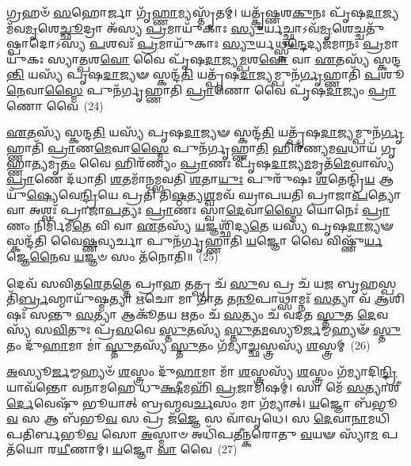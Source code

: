 𑌗𑍍𑌰𑌹𑍞᳴ \ul{𑌸}\-𑌹𑍋𑌰𑍍𑌜𑌾 𑌗𑍃᳴\-\ul{𑌹𑍍𑌣𑌾}\-𑌮𑍍𑌯𑌸𑍍𑌤𑍃᳴𑌤𑌮𑍍। 𑌯𑌤𑍍𑌕𑍃᳴𑌷𑍍𑌣𑌶\-\ul{𑌕𑍁}\-𑌨𑌃 𑌪𑍃᳴𑌷\-\ul{𑌦𑌾}\-𑌜𑍍𑌯𑌮᳴𑌵\-\ul{𑌮𑍃}\-𑌶𑍇\-\ul{𑌚𑍍𑌛𑍂}\-𑌦𑍍𑌰𑌾 𑌅᳴𑌸𑍍𑌯 \ul{𑌪𑍍𑌰}\-𑌮𑌾𑌯𑍁᳴𑌕𑌾𑌃 \ul{𑌸𑍍𑌯𑍁}\-𑌰𑍍𑌯𑌚𑍍𑌛𑍍𑌵𑌾\-𑌽𑌵᳴\-\ul{𑌮𑍃}\-𑌶𑍇𑌚𑍍𑌚𑌤𑍁᳴𑌷𑍍𑌪𑌾𑌦𑍋\-𑌽𑌸𑍍𑌯 \ul{𑌪}\-𑌶𑌵𑌃᳴ \ul{𑌪𑍍𑌰}\-𑌮𑌾𑌯𑍁᳴𑌕𑌾𑌃 \ul{𑌸𑍍𑌯𑍁}\-𑌰𑍍𑌯𑌥𑍍𑌸𑍍𑌕\-\ul{𑌨𑍍𑌦𑍇}\-𑌦𑍍𑌯𑌜᳴𑌮𑌾𑌨𑌃 \ul{𑌪𑍍𑌰}\-𑌮𑌾𑌯𑍁᳴𑌕𑌃 𑌸𑍍𑌯𑌾\-\ul{𑌤𑍍𑌪}\-𑌶\-\ul{𑌵𑍋} 𑌵𑍈 𑌪𑍃᳴𑌷\-\ul{𑌦𑌾}\-𑌜𑍍𑌯\-\ul{𑌮𑍍𑌪}\-𑌶\-\ul{𑌵𑍋} 𑌵𑌾 \ul{𑌏}\-𑌤𑌸𑍍𑌯᳴ 𑌸𑍍𑌕𑌨𑍍𑌦\-\ul{𑌨𑍍𑌤𑌿} 𑌯𑌸𑍍𑌯᳴ 𑌪𑍃𑌷\-\ul{𑌦𑌾}\-𑌜𑍍𑌯𑍟 𑌸𑍍𑌕𑌨𑍍𑌦᳴\-\ul{𑌤𑌿} 𑌯𑌤𑍍𑌪𑍃᳴𑌷\-\ul{𑌦𑌾}\-𑌜𑍍𑌯𑌮𑍍𑌪𑍁𑌨᳴\-\ul{𑌰𑍍𑌗𑍃}\-𑌹𑍍𑌣𑌾𑌤𑌿᳴ \ul{𑌪}\-𑌶𑍂\-\ul{𑌨𑍇}\-𑌵𑌾\-\ul{𑌸𑍍𑌮𑍈} 𑌪𑍁𑌨᳴𑌰𑍍𑌗𑍃𑌹𑍍𑌣𑌾𑌤𑌿 \ul{𑌪𑍍𑌰𑌾}\-𑌣𑍋 𑌵𑍈 𑌪𑍃᳴𑌷\-\ul{𑌦𑌾}\-𑌜𑍍𑌯𑌂 \ul{𑌪𑍍𑌰𑌾}\-𑌣𑍋 𑌵𑍈~(24)

\-\ul{𑌏}\-𑌤𑌸𑍍𑌯᳴ 𑌸𑍍𑌕𑌨𑍍𑌦\-\ul{𑌤𑌿} 𑌯𑌸𑍍𑌯᳴ 𑌪𑍃𑌷\-\ul{𑌦𑌾}\-𑌜𑍍𑌯𑍟 𑌸𑍍𑌕𑌨𑍍𑌦᳴\-\ul{𑌤𑌿} 𑌯𑌤𑍍𑌪𑍃᳴𑌷\-\ul{𑌦𑌾}\-𑌜𑍍𑌯𑌮𑍍𑌪𑍁𑌨᳴\-\ul{𑌰𑍍𑌗𑍃}\-𑌹𑍍𑌣𑌾𑌤𑌿᳴ \ul{𑌪𑍍𑌰𑌾}\-𑌣\-\ul{𑌮𑍇}\-𑌵𑌾\-\ul{𑌸𑍍𑌮𑍈} 𑌪𑍁𑌨᳴𑌰𑍍𑌗𑍃𑌹𑍍𑌣𑌾\-\ul{𑌤𑌿} 𑌹𑌿𑌰᳴𑌣𑍍𑌯𑌮\-\ul{𑌵}\-𑌧𑌾𑌯᳴ 𑌗𑍃𑌹𑍍𑌣𑌾\-\ul{𑌤𑍍𑌯}\-𑌮𑍃\-\ul{𑌤𑌂} 𑌵𑍈 𑌹𑌿𑌰᳴𑌣𑍍𑌯𑌂 \ul{𑌪𑍍𑌰𑌾}\-𑌣𑌃 𑌪𑍃᳴𑌷\-\ul{𑌦𑌾}\-𑌜𑍍𑌯\-\ul{𑌮}\-𑌮𑍃𑌤᳴\-\ul{𑌮𑍇}\-𑌵𑌾𑌸𑍍𑌯᳴ \ul{𑌪𑍍𑌰𑌾}\-𑌣𑍇 𑌦᳴𑌧𑌾𑌤𑌿 \ul{𑌶}\-𑌤𑌮𑌾᳴𑌨𑌮𑍍𑌭𑌵𑌤𑌿 \ul{𑌶}\-𑌤𑌾\-\ul{𑌯𑍁𑌃} 𑌪𑍁𑌰𑍁᳴𑌷𑌃 \ul{𑌶}\-𑌤𑍇𑌨𑍍𑌦𑍍𑌰𑌿᳴\-\ul{𑌯} 𑌆𑌯𑍁᳴\-\ul{𑌷𑍍𑌯𑍇}\-𑌵𑍇\-\ul{𑌨𑍍𑌦𑍍𑌰𑌿}\-𑌯𑍇 𑌪𑍍𑌰𑌤𑌿᳴ 𑌤𑌿\-\ul{𑌷𑍍𑌠}\-𑌤𑍍𑌯\-\ul{𑌶𑍍𑌵}\-𑌮𑌵᳴ 𑌘𑍍𑌰𑌾𑌪𑌯𑌤𑌿 𑌪𑍍𑌰𑌾𑌜𑌾\-\ul{𑌪}\-𑌤𑍍𑌯𑍋 𑌵𑌾 𑌅𑌶𑍍𑌵𑌃᳴ 𑌪𑍍𑌰𑌾𑌜𑌾\-\ul{𑌪}\-𑌤𑍍𑌯𑌃 \ul{𑌪𑍍𑌰𑌾}\-𑌣𑌃 𑌸𑍍𑌵𑌾\-\ul{𑌦𑍇}\-𑌵𑌾\-\ul{𑌸𑍍𑌮𑍈} 𑌯𑍋𑌨𑍇𑌃॑ \ul{𑌪𑍍𑌰𑌾}\-𑌣𑌂 𑌨𑌿𑌰𑍍𑌮𑌿᳴𑌮𑍀\-\ul{𑌤𑍇} 𑌵𑌿 𑌵𑌾 \ul{𑌏}\-𑌤𑌸𑍍𑌯᳴ \ul{𑌯}\-𑌜𑍍𑌞𑌶𑍍𑌛𑌿᳴𑌦𑍍𑌯\-\ul{𑌤𑍇} 𑌯𑌸𑍍𑌯᳴ 𑌪𑍃𑌷\-\ul{𑌦𑌾}\-𑌜𑍍𑌯𑍟 𑌸𑍍𑌕𑌨𑍍𑌦᳴𑌤𑌿 𑌵𑍈\-\ul{𑌷𑍍𑌣}\-𑌵𑍍𑌯𑌰𑍍𑌚𑌾 𑌪𑍁𑌨᳴𑌰𑍍𑌗𑍃𑌹𑍍𑌣𑌾𑌤𑌿 \ul{𑌯}\-𑌜𑍍𑌞𑍋 𑌵𑍈 𑌵𑌿𑌷𑍍𑌣𑍁᳴\-\ul{𑌰𑍍𑌯}\-𑌜𑍍𑌞𑍇\-\ul{𑌨𑍈}\-𑌵 \ul{𑌯}\-𑌜𑍍𑌞𑍞 𑌸𑌂 𑌤᳴𑌨𑍋𑌤𑌿॥~(25)

{\anuvakamend[{\-\ul{𑌤𑍇} \ul{𑌪𑍃}\-\-\ul{𑌷}\-\-\ul{𑌦𑌾}\-𑌜𑍍𑌯𑌂 \ul{𑌪𑍍𑌰𑌾}\-𑌣𑍋 𑌵𑍈 𑌯𑍋𑌨𑍇𑌃॑ \ul{𑌪𑍍𑌰𑌾}\-𑌣𑌂 𑌦𑍍𑌵𑌾𑌵𑌿𑍞᳴𑌶𑌤𑌿𑌶𑍍𑌚}]}%

𑌦𑍇𑌵᳴ 𑌸𑌵𑌿𑌤\-\ul{𑌰𑍇}\-𑌤\-\ul{𑌤𑍍𑌤𑍇} 𑌪𑍍𑌰𑌾\-\ul{𑌹} 𑌤𑌤𑍍𑌪𑍍𑌰 𑌚᳴ \ul{𑌸𑍁}\-𑌵 𑌪𑍍𑌰 𑌚᳴ 𑌯\-\ul{𑌜} 𑌬𑍃\-\ul{𑌹}\-𑌸𑍍𑌪𑌤𑌿᳴\-\ul{𑌰𑍍𑌬𑍍𑌰}\-𑌹𑍍𑌮𑌾𑌯𑍁᳴𑌷𑍍𑌮𑌤𑍍𑌯𑌾 \ul{𑌋}\-𑌚𑍋 𑌮𑌾 𑌗𑌾᳴𑌤 𑌤\-\ul{𑌨𑍂}\-𑌪𑌾𑌥𑍍𑌸𑌾𑌮𑍍𑌨𑌃᳴ \ul{𑌸}\-𑌤𑍍𑌯𑌾 𑌵᳴ \ul{𑌆}\-𑌶𑌿𑌷𑌃᳴ 𑌸𑌨𑍍𑌤𑍁 \ul{𑌸}\-𑌤𑍍𑌯𑌾 𑌆𑌕𑍂᳴𑌤𑌯 \ul{𑌋}\-𑌤𑌂 𑌚᳴ \ul{𑌸}\-𑌤𑍍𑌯𑌂 𑌚᳴ 𑌵𑌦𑌤 \ul{𑌸𑍍𑌤𑍁}\-𑌤 \ul{𑌦𑍇}\-𑌵𑌸𑍍𑌯᳴ 𑌸\-\ul{𑌵𑌿}\-𑌤𑍁𑌃 𑌪𑍍𑌰᳴\-\ul{𑌸}\-𑌵𑍇 \ul{𑌸𑍍𑌤𑍁}\-𑌤𑌸𑍍𑌯᳴ \ul{𑌸𑍍𑌤𑍁}\-𑌤\-\ul{𑌮}\-𑌸𑍍𑌯𑍂\-\ul{𑌰𑍍𑌜}\-𑌮𑍍𑌮𑌹𑍍𑌯𑍟᳴ \ul{𑌸𑍍𑌤𑍁}\-𑌤𑌂 𑌦𑍁᳴\-\ul{𑌹𑌾}\-𑌮𑌾 𑌮𑌾॑ \ul{𑌸𑍍𑌤𑍁}\-𑌤𑌸𑍍𑌯᳴ \ul{𑌸𑍍𑌤𑍁}\-𑌤𑌂 𑌗᳴𑌮𑍍𑌯𑌾\-\ul{𑌚𑍍𑌛}\-𑌸𑍍𑌤𑍍𑌰𑌸𑍍𑌯᳴ \ul{𑌶}\-𑌸𑍍𑌤𑍍𑌰𑌮𑍍~(26)

\-\ul{𑌅}\-𑌸𑍍𑌯𑍂\-\ul{𑌰𑍍𑌜}\-𑌮𑍍𑌮𑌹𑍍𑌯𑍞᳴ \ul{𑌶}\-𑌸𑍍𑌤𑍍𑌰𑌂 𑌦𑍁᳴\-\ul{𑌹𑌾}\-𑌮𑌾 𑌮𑌾᳴ \ul{𑌶}\-𑌸𑍍𑌤𑍍𑌰𑌸𑍍𑌯᳴ \ul{𑌶}\-𑌸𑍍𑌤𑍍𑌰𑌂 𑌗᳴𑌮𑍍𑌯𑌾𑌦𑌿\-\ul{𑌨𑍍𑌦𑍍𑌰𑌿}\-𑌯𑌾𑌵᳴𑌨𑍍𑌤𑍋 𑌵𑌨𑌾𑌮𑌹𑍇 𑌧𑍁\-\ul{𑌕𑍍𑌷𑍀}\-𑌮𑌹𑌿᳴ \ul{𑌪𑍍𑌰}\-𑌜𑌾𑌮𑌿𑌷𑌮𑍍॑। 𑌸𑌾 𑌮𑍇᳴ \ul{𑌸}\-𑌤𑍍𑌯𑌾𑌶𑍀\-\ul{𑌰𑍍𑌦𑍇}\-𑌵𑍇𑌷𑍁᳴ 𑌭𑍂𑌯𑌾𑌤𑍍 𑌬𑍍𑌰𑌹𑍍𑌮𑌵\-\ul{𑌰𑍍𑌚}\-𑌸𑌂 𑌮𑌾 𑌗᳴𑌮𑍍𑌯𑌾𑌤𑍍। \ul{𑌯}\-𑌜𑍍𑌞𑍋 𑌬᳴𑌭𑍂\-\ul{𑌵} 𑌸 𑌆 𑌬᳴𑌭𑍂\-\ul{𑌵} 𑌸 𑌪𑍍𑌰 𑌜᳴\-\ul{𑌜𑍍𑌞𑍇} 𑌸 𑌵𑌾᳴𑌵𑍃𑌧𑍇। 𑌸 \ul{𑌦𑍇}\-𑌵𑌾\-\ul{𑌨𑌾}\-𑌮𑌧𑌿᳴𑌪𑌤𑌿𑌰𑍍𑌬𑌭𑍂\-\ul{𑌵} 𑌸𑍋 \ul{𑌅}\-𑌸𑍍𑌮𑌾𑍞 𑌅𑌧𑌿᳴𑌪𑌤𑍀𑌨𑍍𑌕𑌰𑍋𑌤𑍁 \ul{𑌵}\-𑌯𑍟 𑌸𑍍𑌯𑌾᳴\-\ul{𑌮} 𑌪𑌤᳴𑌯𑍋 𑌰\-\ul{𑌯𑍀}\-𑌣𑌾𑌮𑍍। \ul{𑌯}\-𑌜𑍍𑌞𑍋 \ul{𑌵𑌾} 𑌵𑍈~(27)

